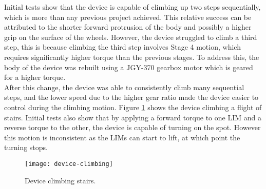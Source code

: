 Initial tests show that the device is capable of climbing up two steps sequentially, which is more than any previous project achieved. This relative success can be attributed to the shorter forward protrusion of the body and possibly a higher grip on the surface of the wheels. However, the device struggled to climb a third step, this is because climbing the third step involves Stage 4 motion, which requires significantly higher torque than the previous stages. To address this, the body of the device was rebuilt using a JGY-370 gearbox motor which is geared for a higher torque. \\
After this change, the device was able to consistently climb many sequential steps, and the lower speed due to the higher gear ratio made the device easier to control during the climbing motion. Figure \ref{fig:device-climbing} shows the device climbing a flight of stairs. Initial tests also show that by applying a forward torque to one LIM and a reverse torque to the other, the device is capable of turning on the spot. However this motion is inconsistent as the LIMs can start to lift, at which point the turning stops.
\begin{figure}[!ht]
	\centering
	\texttt{[image: device-climbing]}
	\caption{Device climbing stairs.}
	\label{fig:device-climbing}
\end{figure}
%
